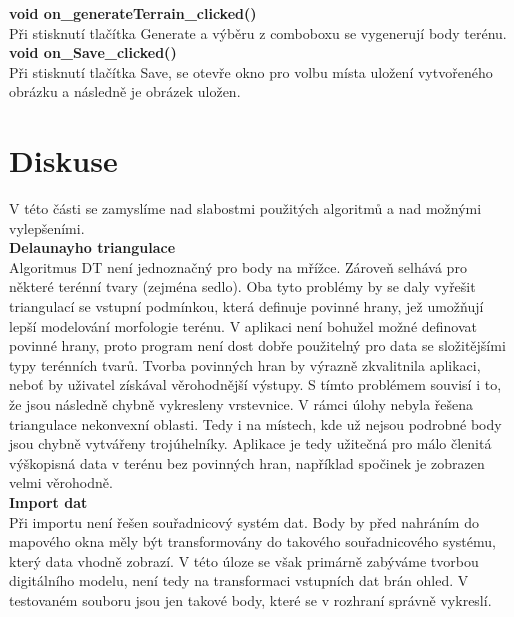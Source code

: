 \documentclass[a4paper,11pt,twoside]{article}
\begin{document}
\noindent\textbf{void on\_generateTerrain\_clicked()}\\
Při stisknutí tlačítka Generate a výběru z comboboxu se vygenerují body terénu.\\

\noindent\textbf{void on\_Save\_clicked()}\\
Při stisknutí tlačítka Save, se otevře okno pro volbu místa uložení vytvořeného obrázku a následně je obrázek uložen.



\newpage
{}

\vspace*{-1cm}
\section*{Diskuse}
V této části se zamyslíme nad slabostmi použitých algoritmů a nad možnými vylepšeními. \\

\noindent\textbf{Delaunayho triangulace}\\
\noindent Algoritmus DT není jednoznačný pro body na mřížce. Zároveň selhává pro některé terénní tvary (zejména sedlo). Oba tyto problémy by se daly vyřešit triangulací se vstupní podmínkou, která definuje povinné hrany, jež umožňují lepší modelování morfologie terénu. V aplikaci není bohužel možné definovat povinné hrany, proto program není dost dobře použitelný pro data se složitějšími typy terénních tvarů. Tvorba povinných hran by výrazně zkvalitnila aplikaci, neboť by uživatel získával věrohodnější výstupy. S tímto problémem souvisí i to, že jsou následně chybně vykresleny vrstevnice. V rámci úlohy nebyla řešena triangulace nekonvexní oblasti. Tedy i na místech, kde už nejsou podrobné body jsou chybně vytvářeny trojúhelníky. Aplikace je tedy užitečná pro málo členitá výškopisná data v terénu bez povinných hran, například spočinek je zobrazen velmi věrohodně.\\

\noindent\textbf{Import dat}\\
\noindent Při importu není řešen souřadnicový systém dat. Body by před nahráním do mapového okna měly být transformovány do takového souřadnicového systému, který data vhodně zobrazí. V této úloze se však primárně zabýváme tvorbou digitálního modelu, není tedy na transformaci vstupních dat brán ohled. V testovaném souboru jsou jen takové body, které se v rozhraní správně vykreslí. \\
\end{document}
